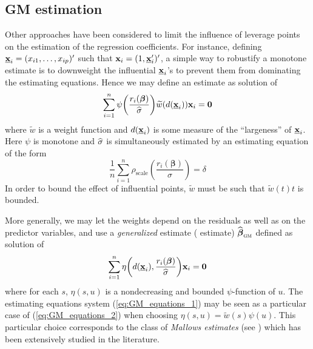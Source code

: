 \subsection{GM estimation}

Other approaches have been considered to limit the influence of leverage points
on the estimation of the regression coefficients. For instance, defining
$\underline{\mathbf x}_{i} = (x_{i1}, \ldots, x_{ip})'$ such that
$\mathbf x_{i} = (1,\underline{\mathbf x}_{i}')'$, a simple way to robustify a
monotone  estimate is to downweight the influential
$\underline{\mathbf x}_{i}$'s to prevent them from dominating the estimating
equations. Hence we may define an estimate as solution of
\begin{equation}\label{eq:GM_equations_1}
    \sum_{i=1}^{n} \psi\left(\frac{r_{i}(\boldsymbol\beta)}{\sthat{\sigma}}\right) 
    \widetilde{w}(d(\underline{\stvec{x}}_{i})) \stvec{x}_{i} = \mathbf{0}
\end{equation}
where $\widetilde{w}$ is a weight function and $d(\underline{\mathbf x}_{i})$
is some measure of the “largeness” of $\underline{\mathbf x}_{i}$. Here $\psi$
is monotone and $\widehat{\sigma}$ is simultaneously estimated by an 
estimating equation of the form
\[
    \frac{1}{n}\sum_{i=1}^{n} \rho_{\mathrm{scale}}\left(\frac{r_{i}(\boldsymbol\beta)}{\sigma}\right)  = \delta
\]
In order to bound the effect of influential points, $\widetilde{w}$ must be
such that $\widetilde{w}(t)t$ is bounded.

More generally, we may let the weights depend on the residuals as well as on
the predictor variables, and use a \emph{generalized}  estimate
( estimate) $\sthat{\boldsymbol\beta}_{\stsc{GM}}$ defined as solution
of
%
\begin{equation}\label{eq:GM_equations_2}
    \sum_{i=1}^{n}\eta\left(d(\underline{\stvec{x}}_{i}), \frac{r_{i}(\boldsymbol\beta)}{\sthat{\sigma}}\right)
    \stvec{x}_{i} = \mathbf{0}
\end{equation}
%
where for each $s$, $\eta(s,u)$ is a nondecreasing and bounded $\psi$-function
of $u$. The estimating equations system (\ref{eq:GM_equations_1}) may be seen
as a particular case of (\ref{eq:GM_equations_2}) when choosing $\eta(s,u) =
\widetilde{w}(s) \psi(u)$. This particular choice corresponds to the class of
\emph{Mallows estimates} (see \citealp{Mallows:1975}) which has been
extensively studied in the literature.

